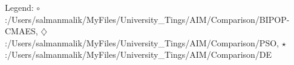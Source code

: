 Legend: {\color{NavyBlue}$\circ$}:/Users/salmanmalik/MyFiles/University\_Tings/AIM/Comparison/BIPOP-CMAES, {\color{Magenta}$\diamondsuit$}:/Users/salmanmalik/MyFiles/University\_Tings/AIM/Comparison/PSO, {\color{Orange}$\star$}:/Users/salmanmalik/MyFiles/University\_Tings/AIM/Comparison/DE
